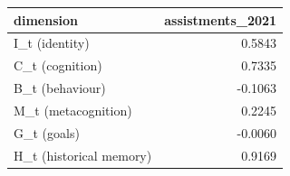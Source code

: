 \begin{tabular}{lr}
\toprule
dimension & assistments\_2021 \\
\midrule
I\_t (identity) & 0.5843 \\
C\_t (cognition) & 0.7335 \\
B\_t (behaviour) & -0.1063 \\
M\_t (metacognition) & 0.2245 \\
G\_t (goals) & -0.0060 \\
H\_t (historical memory) & 0.9169 \\
\bottomrule
\end{tabular}
